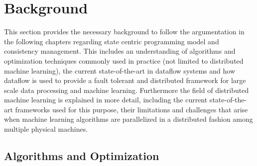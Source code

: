 
\chapter{Background}
\label{c:background}
This section provides the necessary background to follow the argumentation in the following chapters regarding state centric programming model and consistency management.
This includes an understanding of algorithms and optimization techniques commonly used in practice (not limited to distributed machine learning), the current state-of-the-art in dataflow systems and how dataflow is used to provide a fault tolerant and distributed framework for large scale data processing and machine learning.
Furthermore the field of distributed machine learning is explained in more detail, including the current state-of-the-art frameworks used for this purpose, their limitations and challenges that arise when machine learning algorithms are parallelized in a distributed fashion among multiple physical machines.


\section{Algorithms and Optimization}

